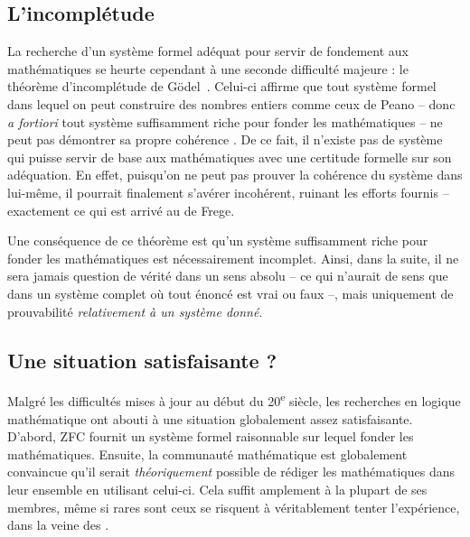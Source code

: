 \subsection{L’incomplétude}

La recherche d’un système formel adéquat pour servir de fondement aux mathématiques 
se heurte cependant à une seconde difficulté majeure : le théorème d’incomplétude de
Gödel~. Celui-ci affirme que tout système formel
dans lequel on peut construire des nombres entiers comme ceux de Peano – donc
\textit{a fortiori} tout système suffisamment riche pour fonder les mathématiques –
ne peut pas démontrer sa propre cohérence%
.
De ce fait, il n’existe pas de
système qui puisse servir de base aux mathématiques
avec une certitude formelle sur son adéquation.
En effet, puisqu’on ne peut pas prouver la cohérence du
système dans lui-même, il pourrait finalement s’avérer incohérent, ruinant les
efforts fournis – exactement ce qui est arrivé au  de Frege.

Une conséquence de ce théorème est qu’un système suffisamment riche
pour fonder les mathématiques est nécessairement incomplet.%
Ainsi, dans la suite, il ne sera jamais question de vérité dans un sens absolu –
ce qui n’aurait de sens que dans un système complet
où tout énoncé est vrai ou faux –, mais
uniquement de prouvabilité \emph{relativement à un système donné}.

\subsection{Une situation satisfaisante ?}

Malgré les difficultés mises à jour au début du 20\textsuperscript{e}
siècle, les recherches en logique mathématique ont abouti à une situation
globalement assez satisfaisante. D’abord, ZFC fournit un système formel raisonnable sur
lequel fonder les mathématiques. Ensuite,
la communauté mathématique est globalement convaincue qu’il serait
\emph{théoriquement} possible de rédiger les mathématiques dans leur ensemble
en utilisant celui-ci. Cela suffit amplement à la plupart de ses membres,
même si rares sont ceux se risquent à véritablement tenter l’expérience, dans la veine
des .

